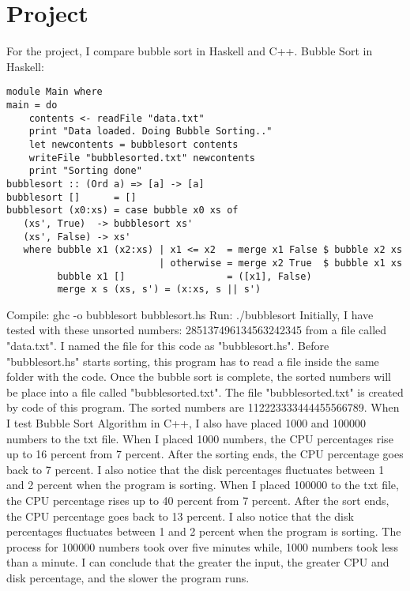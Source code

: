 \documentclass{article}
\begin{document}
\section{Project}
For the project, I compare bubble sort in Haskell and C++.
\newline \newline Bubble Sort in Haskell:
\begin{lstlisting}
module Main where
main = do
    contents <- readFile "data.txt"
    print "Data loaded. Doing Bubble Sorting.."
    let newcontents = bubblesort contents
    writeFile "bubblesorted.txt" newcontents
    print "Sorting done"
bubblesort :: (Ord a) => [a] -> [a]
bubblesort []      = []
bubblesort (x0:xs) = case bubble x0 xs of
   (xs', True)  -> bubblesort xs'
   (xs', False) -> xs'
   where bubble x1 (x2:xs) | x1 <= x2  = merge x1 False $ bubble x2 xs
                           | otherwise = merge x2 True  $ bubble x1 xs
         bubble x1 []                  = ([x1], False)
         merge x s (xs, s') = (x:xs, s || s')       
  \end{lstlisting}
Compile: ghc -o bubblesort bubblesort.hs
 \newline Run: ./bubblesort
\newline \newline Initially, I have tested with these unsorted numbers: 285137496134563242345 from a file called "data.txt". I named the file for this code as "bubblesort.hs". Before "bubblesort.hs" starts sorting, this program has to read a file inside the same folder with the code. Once the bubble sort is complete, the sorted numbers will be place into a file called "bubblesorted.txt". The file "bubblesorted.txt" is created by code of this program. The sorted numbers are 112223333444455566789.
\newline \newline When I test Bubble Sort Algorithm in C++, I also have placed 1000 and 100000 numbers to the txt file. When I placed 1000 numbers, the CPU percentages rise up to 16 percent from 7 percent. After the sorting ends, the CPU percentage goes back to 7 percent. I also notice that the disk percentages fluctuates between 1 and 2 percent when the program is sorting. When I placed 100000 to the txt file, the CPU percentage rises up to 40 percent from 7 percent. After the sort ends, the CPU percentage goes back to 13 percent. I also notice that the disk percentages fluctuates between 1 and 2 percent when the program is sorting. The process for 100000 numbers took over five minutes while, 1000 numbers took less than a minute. I can conclude that the greater the input, the greater CPU and disk percentage, and the slower the program runs.
\end{document}
